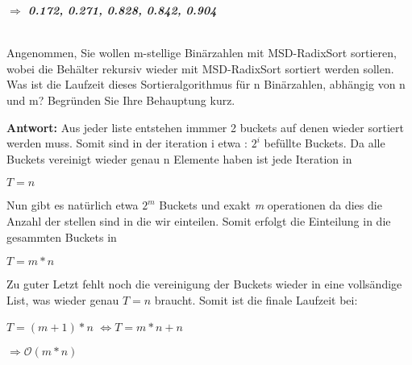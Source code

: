 \documentclass[12pt, a4paper, twoside]{article}
\begin{document}
\begin{description}
	\textbf{$\Longrightarrow$ \emph{0.172, 0.271, 0.828, 0.842, 0.904}}
	
	
	\item[c)] \hfill \\
	Angenommen, Sie wollen m-stellige Binärzahlen mit MSD-RadixSort sortieren, wobei
	die Behälter rekursiv wieder mit MSD-RadixSort sortiert werden sollen. Was ist die
	Laufzeit dieses Sortieralgorithmus für n Binärzahlen, abhängig von n und m? Begründen
	Sie Ihre Behauptung kurz.
	\newline
	
	
	\textbf{Antwort:}
	\newline
	Aus jeder liste entstehen immmer 2 buckets auf denen wieder sortiert werden muss.
	Somit sind in der iteration i etwa : \(2^i\)  befüllte Buckets.
	Da alle Buckets vereinigt wieder genau n Elemente haben ist jede Iteration in
	\begin{center}
		\(T = n\)
	\end{center} 
	Nun gibt es natürlich etwa \(2^m\) Buckets und exakt \emph{m} operationen da dies die Anzahl der stellen sind in die wir einteilen.
	Somit erfolgt die Einteilung in die gesammten Buckets in
	\begin{center}
		 \(T = m*n\)
	\end{center}
	Zu guter Letzt fehlt noch die vereinigung der Buckets wieder in eine vollsändige List, was wieder genau \(T = n\)
	braucht. 
	Somit ist die finale Laufzeit bei:
	\begin{center}
		\item\(T = (m+1)*n \) \(\Longleftrightarrow T = m*n + n\)
		\item \emph{\( \Longrightarrow \mathcal{O}(m*n) \)}\\
	\end{center}
	\end{description}
\end{document}
